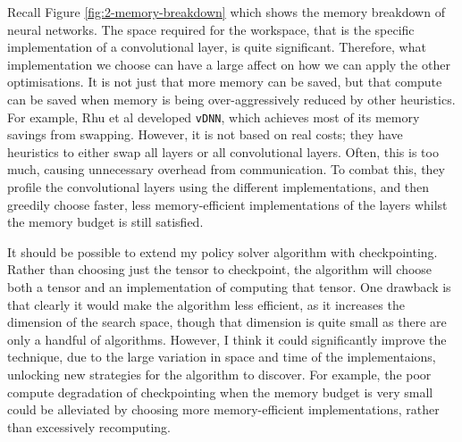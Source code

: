 Recall Figure \ref{fig:2-memory-breakdown} which shows the memory breakdown of neural networks.
The space required for the workspace, that is the specific implementation of a convolutional layer, is quite significant.
Therefore, what implementation we choose can have a large affect on how we can apply the other optimisations.
It is not just that more memory can be saved, but that compute can be saved when memory is being over-aggressively reduced by other heuristics.
For example, Rhu et al \cite{Rhu2016} developed \texttt{vDNN}, which achieves most of its memory savings from swapping.
However, it is not based on real costs; they have heuristics to either swap all layers or all convolutional layers.
Often, this is too much, causing unnecessary overhead from communication.
To combat this, they profile the convolutional layers using the different implementations, and then greedily choose faster, less memory-efficient implementations of the layers whilst the memory budget is still satisfied.

It should be possible to extend my policy solver algorithm with checkpointing.
Rather than choosing just the tensor to checkpoint, the algorithm will choose both a tensor and an implementation of computing that tensor.
One drawback is that clearly it would make the algorithm less efficient, as it increases the dimension of the search space, though that dimension is quite small as there are only a handful of algorithms.
However, I think it could significantly improve the technique, due to the large variation in space and time of the implementaions, unlocking new strategies for the algorithm to discover.
For example, the poor compute degradation of checkpointing when the memory budget is very small could be alleviated by choosing more memory-efficient implementations, rather than excessively recomputing.
